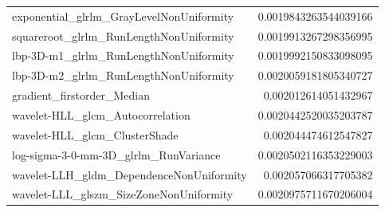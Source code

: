{\begin{xltabular}[H]{\textwidth}{X r}
        exponential\_glrlm\_GrayLevelNonUniformity & 0.0019843263544039166 \\
        squareroot\_glrlm\_RunLengthNonUniformity & 0.0019913267298356995 \\
        lbp-3D-m1\_glrlm\_RunLengthNonUniformity & 0.0019992150833098095 \\
        lbp-3D-m2\_glrlm\_RunLengthNonUniformity & 0.0020059181805340727 \\
        gradient\_firstorder\_Median & 0.002012614051432967 \\
        wavelet-HLL\_glcm\_Autocorrelation & 0.0020442520035203787 \\
        wavelet-HLL\_glcm\_ClusterShade & 0.002044474612547827 \\
        log-sigma-3-0-mm-3D\_glrlm\_RunVariance & 0.0020502116353229003 \\
        wavelet-LLH\_gldm\_DependenceNonUniformity & 0.002057066317705382 \\
        wavelet-LLL\_glszm\_SizeZoneNonUniformity & 0.0020975711670206004
        \vspace{10pt}
\end{xltabular}
}
\fi